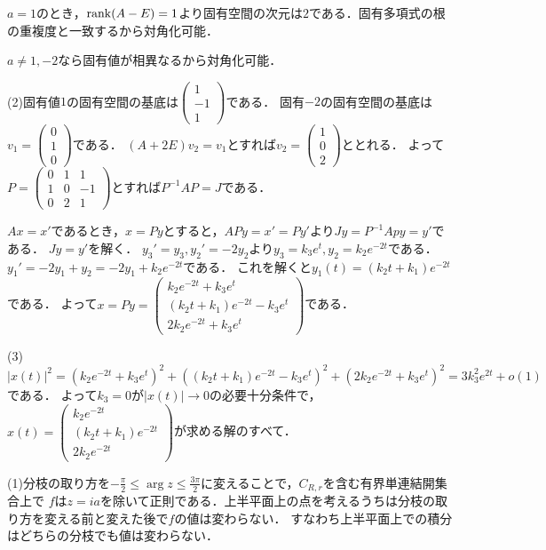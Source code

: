 \documentclass[
		book,
		head_space=20mm,
		foot_space=20mm,
		gutter=10mm,
		line_length=190mm
]{jlreq}
\begin{document}
$a=1$のとき，$\rank (A-E)=1$より固有空間の次元は$2$である．固有多項式の根の重複度と一致するから対角化可能．

$a\neq 1,-2$なら固有値が相異なるから対角化可能．

(2)固有値$1$の固有空間の基底は$\begin{pmatrix}
1\\-1\\1
\end{pmatrix}$である．
固有$-2$の固有空間の基底は$v_1=\begin{pmatrix}
0\\1\\0
\end{pmatrix}$である．
$(A+2E)v_2=v_1$とすれば$v_2=\begin{pmatrix}
1\\0\\2
\end{pmatrix}$ととれる．
よって$P=\begin{pmatrix}
0&1&1\\
1&0&-1\\
0&2&1
\end{pmatrix}$とすれば$P^{-1}AP=J$である．

$Ax=x'$であるとき，$x=Py$とすると，$APy=x'=Py'$より$Jy=P^{-1}Apy=y'$である．
$Jy=y'$を解く．
$y_3'=y_3,y_2'=-2y_2$より$y_3=k_3e^{t},y_2=k_2e^{-2t}$である．
$y_1'=-2y_1+y_2=-2y_1+k_2e^{-2t}$である．
これを解くと$y_1(t)=(k_2t+k_1)e^{-2t}$である．
よって$x=Py=\begin{pmatrix}
k_2e^{-2t}+k_3e^t\\(k_2t+k_1)e^{-2t}-k_3e^t\\ 2k_2e^{-2t}+k_3e^t
\end{pmatrix}$である．

(3)$|x(t)|^2=(k_2e^{-2t}+k_3e^t)^2+((k_2t+k_1)e^{-2t}-k_3e^t)^2+(2k_2e^{-2t}+k_3e^t)^2=3k_3^2e^{2t}+o(1)$である．
よって$k_3=0$が$|x(t)|\to 0$の必要十分条件で，$x(t)=\begin{pmatrix}
k_2e^{-2t}\\(k_2t+k_1)e^{-2t}\\ 2k_2e^{-2t}
\end{pmatrix}$が求める解のすべて．



(1)分枝の取り方を$-\frac{\pi}{2}\le \arg z\le \frac{3\pi}{2}$に変えることで，$C_{R,r}$を含む有界単連結開集合上で
$f$は$z= ia$を除いて正則である．上半平面上の点を考えるうちは分枝の取り方を変える前と変えた後で$f$の値は変わらない．
すなわち上半平面上での積分はどちらの分枝でも値は変わらない．
\end{document}
